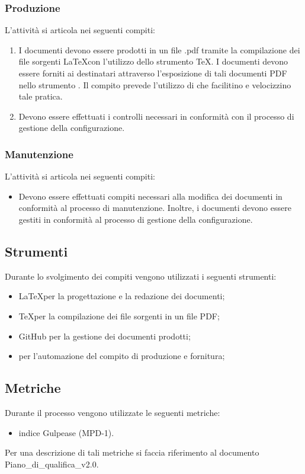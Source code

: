 \subsubsection{Produzione}
L'attività si articola nei seguenti compiti:
\begin{enumerate}
    \item I documenti devono essere prodotti in un file .pdf tramite la compilazione dei file sorgenti \LaTeX con l'utilizzo dello strumento \TeX. I documenti devono essere forniti ai destinatari attraverso l'esposizione di tali documenti PDF nello strumento . Il compito prevede l'utilizzo di  che facilitino e velocizzino tale pratica.
    \item Devono essere effettuati i controlli necessari in conformità con il processo di gestione della configurazione.
\end{enumerate}
\newpage
\subsubsection{Manutenzione}
L'attività si articola nei seguenti compiti:
\begin{itemize}
    \item Devono essere effettuati compiti necessari alla modifica dei documenti in conformità al processo di manutenzione. Inoltre, i documenti devono essere gestiti in conformità al processo di gestione della configurazione.
\end{itemize}

\subsection{Strumenti}
Durante lo svolgimento dei compiti vengono utilizzati i seguenti strumenti:
\begin{itemize}
    \item \LaTeX per la progettazione e la redazione dei documenti;
    \item \TeX per la compilazione dei file sorgenti in un file PDF;
    \item GitHub per la gestione dei documenti prodotti;
    \item {} per l'automazione del compito di produzione e fornitura;
\end{itemize}

\subsection{Metriche}
Durante il processo vengono utilizzate le seguenti metriche:
\begin{itemize}
    \item indice Gulpease (MPD-1).
\end{itemize}
Per una descrizione di tali metriche si faccia riferimento al documento Piano\_di\_qualifica\_v2.0.
\newpage

